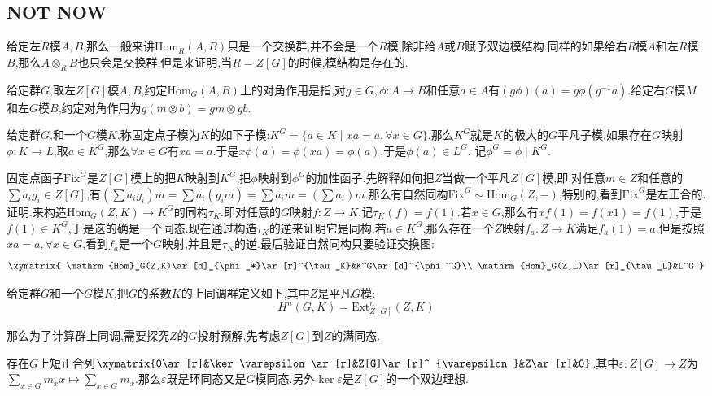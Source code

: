 \newpage
\subsection{NOT NOW}















给定左$R$模$A,B$,那么一般来讲$\mathrm{Hom}_R(A,B)$只是一个交换群,并不会是一个$R$模,除非给$A$或$B$赋予双边模结构.同样的如果给右$R$模$A$和左$R$模$B$,那么$A\otimes_RB$也只会是交换群.但是来证明,当$R=Z[G]$的时候,模结构是存在的.

给定群$G$,取左$Z[G]$模$A,B$,约定$\mathrm{Hom}_G(A,B)$上的对角作用是指,对$g\in G,\phi:A\to B$和任意$a\in A$有$(g\phi)(a)=g\phi(g^{-1}a)$.给定右$G$模$M$和左$G$模$B$,约定对角作用为$g(m\otimes b)=gm\otimes gb$.

给定群$G$,和一个$G$模$K$,称固定点子模为$K$的如下子模:$K^G=\{a\in K\mid xa=a,\forall x\in G\}$.那么$K^G$就是$K$的极大的$G$平凡子模.如果存在$G$映射$\phi:K\to L$,取$a\in K^G$,那么$\forall x\in G$有$xa=a$.于是$x\phi(a)=\phi(xa)=\phi(a)$,于是$\phi(a)\in L^G$. 记$\phi^G=\phi\mid K^G$.

固定点函子$\mathrm{Fix}^G$是$Z[G]$模上的把$K$映射到$K^G$,把$\phi$映射到$\phi^G$的加性函子.先解释如何把$Z$当做一个平凡$Z[G]$模,即,对任意$m\in Z$和任意的$\sum a_ig_i\in Z[G]$,有$(\sum a_ig_i)m=\sum a_i(g_im)=\sum a_im=(\sum a_i)m$.那么有自然同构$\mathrm{Fix} ^G\sim \mathrm{Hom}_G(Z,-)$,特别的,看到$\mathrm{Fix}^G$是左正合的.证明.来构造$\mathrm{Hom}_G(Z,K)\to K^G$的同构$\tau_K$.即对任意的$G$映射$f:Z\to K$,记$\tau_K(f)=f(1)$.若$x\in G$,那么有$xf(1)=f(x1)=f(1)$,于是$f(1)\in K^G$,于是这的确是一个同态.现在通过构造$\tau_K$的逆来证明它是同构.若$a\in K^G$,那么存在一个$Z$映射$f_a:Z\to K$满足$f_a(1)=a$.但是按照$xa=a,\forall x\in G$,看到$f_a$是一个$G$映射,并且是$\tau_K$的逆.最后验证自然同构只要验证交换图:
$$\xymatrix{
	\mathrm{Hom}_G(Z,K)\ar[d]_{\phi_*}\ar[r]^{\tau_K}&K^G\ar[d]^{\phi^G}\\
	\mathrm{Hom}_G(Z,L)\ar[r]_{\tau_L}&L^G
}$$

给定群$G$和一个$G$模$K$,把$G$的系数$K$的上同调群定义如下,其中$Z$是平凡$G$模:
$$H^n(G,K)=\mathrm{Ext}_{Z[G]}^n(Z,K)$$

那么为了计算群上同调,需要探究$Z$的$G$投射预解,先考虑$Z[G]$到$Z$的满同态.

存在$G$上短正合列$\xymatrix{0\ar[r]&\ker\varepsilon\ar[r]&Z[G]\ar[r]^ {\varepsilon}&Z\ar[r]&0}$.其中$\varepsilon:Z[G]\to Z$为$\sum_{x\in G}m_xx\mapsto\sum_{x\in G}m_x$.那么$\varepsilon$既是环同态又是$G$模同态.另外$\ker\varepsilon$是$Z[G]$的一个双边理想.

